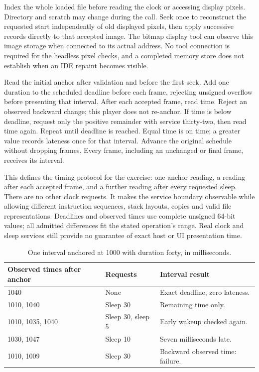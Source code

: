 Index the whole loaded file before reading the clock or accessing display pixels.
Directory and scratch may change during the call. Seek once to reconstruct the
requested start independently of old displayed pixels, then apply successive
records directly to that accepted image. The bitmap display tool can observe this
image storage when connected to its actual address. No tool connection is required
for the headless pixel checks, and a completed memory store does not establish
when an IDE repaint becomes visible.

Read the initial anchor after validation and before the first seek. Add one duration
to the scheduled deadline before each frame, rejecting unsigned overflow before
presenting that interval. After each accepted frame, read time. Reject an observed
backward change; this player does not re-anchor. If time is below deadline, request
only the positive remainder with service thirty-two, then read time again. Repeat
until deadline is reached. Equal time is on time; a greater value records lateness
once for that interval. Advance the original schedule without dropping frames.
Every frame, including an unchanged or final frame, receives its interval.

This defines the timing protocol for the exercise: one anchor reading, a reading
after each accepted frame, and a further reading after every requested sleep.
There are no other clock requests. It makes the service boundary observable while
allowing different instruction sequences, stack layouts, copies and valid file
representations. Deadlines and observed times use complete unsigned 64-bit values;
all admitted differences fit the stated operation's range. Real clock and sleep
services still provide no guarantee of exact host or UI presentation time.

\begin{table}[htbp]
  \centering
  \caption{One interval anchored at 1000 with duration forty, in milliseconds.}
  \label{tab:video-playback-timelines}
  \begin{tabular}{l p{1.5in} p{2.1in}}
    \toprule
    Observed times after anchor & Requests          & Interval result                  \\
    \midrule
    1040                        & None              & Exact deadline, zero lateness.   \\
    1010, 1040                  & Sleep 30          & Remaining time only.             \\
    1010, 1035, 1040            & Sleep 30, sleep 5 & Early wakeup checked again.      \\
    1030, 1047                  & Sleep 10          & Seven milliseconds late.         \\
    1010, 1009                  & Sleep 30          & Backward observed time: failure. \\
    \bottomrule
  \end{tabular}
\end{table}

